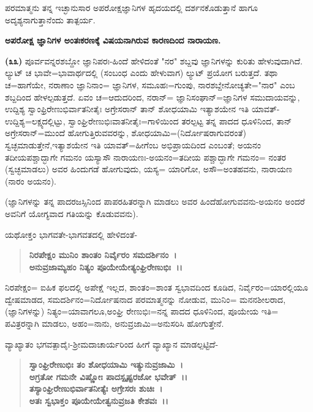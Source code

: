 ಪರಮಾತ್ಮನು ತನ್ನ ಇಚ್ಛಾನುಸಾರ ಅಪರೋಕ್ಷಜ್ಞಾನಿಗಳ ಹೃದಯದಲ್ಲಿ ದರ್ಶನಕೊಡುತ್ತಾನೆ ಹಾಗೂ ಅದೃಶ್ಯನಾಗುತ್ತಾನೆಂದು ತಾತ್ಪರ್ಯ.

\begin{center}
\textbf{ಅಪರೋಕ್ಷ ಜ್ಞಾನಿಗಳ ಅಂತಃಕರಣಕ್ಕೆ ವಿಷಯನಾಗಿರುವ ಕಾರಣದಿಂದ ನಾರಾಯಣ.}
\end{center}

\textbf{(೩೩)} ಪೂರ್ವವನ್ನರಶಬ್ದೋ ಜ್ಞಾನಿಪರಃ-ಹಿಂದೆ ಹೇಳಿದಂತೆ "ನರ" ಶಬ್ದವು ಜ್ಞಾನಿಗಳನ್ನು ಕುರಿತು ಹೇಳುವುದಾಗಿದೆ. ಲ್ಯುಟ್ ಚ ಭಾವೇ=ಭಾವಾರ್ಥದಲ್ಲಿ (ಸಂಬಂಧ ಎಂದು ಹೇಳುವಾಗ) ಲ್ಯುಟ್ ಪ್ರಯೋಗ ಬರುತ್ತದೆ. ತಥಾ ಚ=ಹಾಗೆಯೇ, ನರಾಣಾಂ ಜ್ಞಾನಿನಾಂ= ಜ್ಞಾನಿಗಳ, ಸಮೂಹಃ=ಗುಂಪು, ನಾರಶಬ್ದೇನೋಚ್ಯತೇ="ನಾರ" ಎಂಬ ಶಬ್ದದಿಂದ ಹೇಳಲ್ಪಡುತ್ತದೆ. ಏವಂ ಚ=ಆದುದರಿಂದ, ನರಾನ್= ಜ್ಞಾನಿಸಂಘಾನ್=ಜ್ಞಾನಿಗಳ ಸಮುದಾಯವನ್ನು, ಉದ್ದಿಶ್ಯ ಸ್ವಾಂಫ್ರಿರೇಣುಭಿರ್ವಾತನೀತೈಃ ಅಗ್ರೇಸರಾನ್ ತಾನ್ ಶೋಧ\-ಯಾಮಿ ಇತ್ಯಾಶಯೇನ ಇತಿ ಯಾವತ್‌-ಉದ್ದಿಶ್ಯ=ಲಕ್ಷ್ಯದಲ್ಲಿಟ್ಟು, ಸ್ವಾಂಘ್ರಿರೇಣುಭಿಃವಾತನೀತೈಃ=ಗಾಳಿಯಿಂದ ತರಲ್ಪಟ್ಟ ತನ್ನ ಪಾದದ ಧೂಳಿನಿಂದ, ತಾನ್ ಅಗ್ರೇಸರಾನ್=ಮುಂದೆ ಹೋಗುತ್ತಿರುವವರನ್ನು, ಶೋಧಯಾಮಿ=(ನಿರ್ದೋಷರಾಗುವರಂತೆ) ಸ್ವಚ್ಛಮಾಡುತ್ತೇನೆ,\break ಇತ್ಯಾಶಯೇನ ಇತಿ ಯಾವತ್=ಹೀಗೆಂಬ ಅಭಿಪ್ರಾಯದಿಂದ ಎಂಬಂತೆ; ಅಯನಂ ತದೀಯಪಶ್ಚಾದ್ಭಾಗೇ ಗಮನಂ ಯಸ್ಯಾಸೌ ನಾರಾಯಣಃ-ಅಯನಂ=ತದೀಯ ಪಶ್ಚಾದ್ಭಾಗೇ ಗಮನಂ= ನಂತರ (ಸ್ವಚ್ಛಮಾಡಲು) ಅವರ ಹಿಂದುಗಡೆ ಹೋಗುವುದು, ಯಸ್ಯ= ಯಾರಿಗೋ, ಅಸೌ=ಅಂತಹವನು, ನಾರಾಯಣ (ನಾರಂ ಅಯನಂ).

(ಜ್ಞಾನಿಗಳನ್ನು ತನ್ನ ಪಾದರಜಸ್ಸಿನಿಂದ ಪಾಪರಹಿತರನ್ನಾಗಿ ಮಾಡಲು ಅವರ ಹಿಂದೆ\break ಹೋಗುವವನು-ಅಯನಂ ಅಂದರೆ ಅವನಿಗೆ ಯೋಗ್ಯವಾದ ಗತಿಯನ್ನು ಕೊಡುವವನು).

ಯಥೋಕ್ತಂ ಭಾಗವತೇ-ಭಾಗವತದಲ್ಲಿ ಹೇಳಿದಂತೆ-

\begin{verse}
\textbf{ನಿರಪೇಕ್ಷಂ ಮುನಿಂ ಶಾಂತಂ ನಿರ್ವೈರಂ ಸಮದರ್ಶಿನಂ~।}\\\textbf{ಅನುವ್ರಜಾಮ್ಯಹಂ ನಿತ್ಯಂ ಪೂಯೇಯೇತ್ಯಂಘ್ರಿರೇಣುಭಿಃ~।।}
\end{verse}

ನಿರಪೇಕ್ಷಂ= ಐಹಿಕ ಫಲದಲ್ಲಿ ಅಪೇಕ್ಷೆ ಇಲ್ಲದ, ಶಾಂತಂ=ಶಾಂತ ಸ್ವಭಾವದಿಂದ ಕೂಡಿದ, ನಿರ್ವೈರಂ=ಯಾರಲ್ಲಿಯೂ ದ್ವೇಷಮಾಡದ, ಸಮದರ್ಶಿನಂ=ನಿರ್ದೋಷನಾದ ಪರಮಾತ್ಮ\-ನನ್ನು ನೋಡುವ, ಮುನಿಂ= ಮನನಶೀಲರಾದ, (ಜ್ಞಾನಿಗಳನ್ನು) ನಿತ್ಯಂ=ಯಾವಾಗಲೂ,\break ಅಂಘ್ರಿ ರೇಣುಭಿಃ=ನನ್ನ ಪಾದದ ಧೂಳಿನಿಂದ, ಪೂಯೇಯ ಇತಿ= ಪವಿತ್ರರನ್ನಾಗಿ ಮಾಡಲು, ಅಹಂ=ನಾನು, ಅನುವ್ರಜಾಮಿ=ಅನುಸರಿಸಿ ಹೋಗುತ್ತೇನೆ.

ವ್ಯಾಖ್ಯಾತಂ ಭಗವತ್ಪಾದೈಃ-ಶ‍್ರೀಮದಾಚಾರ್ಯರಿಂದ ಹೀಗೆ ವ್ಯಾಖ್ಯಾನ ಮಾಡಲ್ಪ\-ಟ್ಟಿದೆ-

\begin{verse}
\textbf{ಸ್ವಾಂಘ್ರಿರೇಣುಭಿಃ ತಂ ಶೋಧಯಾಮಿ ಇತ್ಯುನುವ್ರಜಾಮಿ~।}\\\textbf{ಅಗ್ರತೋ ಗಮನೇ ವಿಷ್ಣೋಃ ಪಾದಸ್ಪೃಷ್ಟರಜೋ ಭವೇತ್~।।}\\\textbf{ತಸ್ಯಾಂಘ್ರಿರೇಣುಭಿರ್ವಾತನೀತ್ಯೆಃ ಅಗ್ರೇಸರಃ ಶುಚಿಃ~।}\\\textbf{ಅತಃ ಸ್ವಭಾಕ್ತಂ ಪೂಯೇಯೇತ್ವನುವ್ರಜತಿ ಕೇಶವಃ~।।}
\end{verse}

